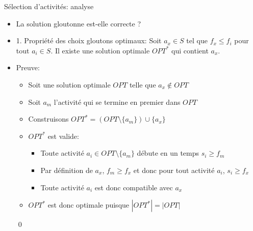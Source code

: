 \begin{frame}{Sélection d'activités: analyse}
\begin{itemize}
\item La solution gloutonne est-elle correcte ?

\bigskip

\item \alert{1. Propriété des choix gloutons optimaux:} Soit $a_x\in S$ tel que $f_x\leq f_i$ pour tout $a_i\in S$. Il existe une solution optimale $OPT^*$ qui contient $a_x$.
\item \alert{Preuve:}
\begin{itemize}
\item Soit une solution optimale $OPT$ telle que $a_x\notin OPT$
\item Soit $a_m$ l'activité qui se termine en premier dans $OPT$
\item Construisons $OPT^*=(OPT\setminus \{a_m\})\cup \{a_x\}$
\item $OPT^*$ est valide:
\begin{itemize}
\item Toute activité $a_i\in OPT\setminus \{a_m\}$ débute en un temps $s_i\geq f_m$
\item Par définition de $a_x$, $f_m\geq f_x$ et donc pour tout activité $a_i$, $s_i\geq f_x$
\item Toute activité $a_i$ est donc compatible avec $a_x$
\end{itemize}
\item $OPT^*$ est donc optimale puisque $|OPT^*|=|OPT|$
\end{itemize}\qed
\end{itemize}


\end{frame}

